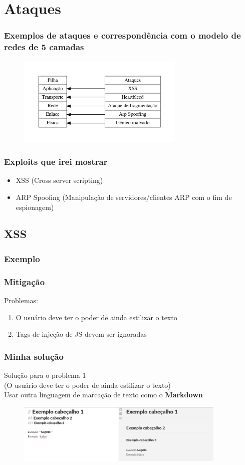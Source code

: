 \documentclass{beamer}
\begin{document}
\section{Ataques}
\begin{frame}
	\frametitle{Exemplos de ataques e correspondência com o modelo de redes de 5 camadas}
	\begin{figure}[htp]
		\includegraphics[width=8cm]{pilha_ataque.pdf}
	\end{figure}
\end{frame}
\begin{frame}
	\frametitle{Exploits que irei mostrar}
	\begin{itemize}
		\item XSS (Cross server scripting)
		\item ARP Spoofing (Manipulação de servidores/clientes ARP com o fim de espionagem)
	\end{itemize}
\end{frame}

\subsection{XSS}
\begin{frame}
	\frametitle{Exemplo}
\end{frame}

\begin{frame}
	\frametitle{Mitigação}
	Problemas:
	\begin{enumerate}
		\item O usuário deve ter o poder de ainda estilizar o texto
		\item Tags de injeção de JS devem ser ignoradas
	\end{enumerate}
\end{frame}

\begin{frame}
	\frametitle{Minha solução}
	Solução para o problema 1\\
	(O usuário deve ter o poder de ainda estilizar o texto)\\
	Usar outra linguagem de marcação de texto como o \textbf{Markdown}
	\begin{figure}[htp]
		\includegraphics[width=10cm]{markdown_example.png}
	\end{figure}

\end{frame}
\end{document}
